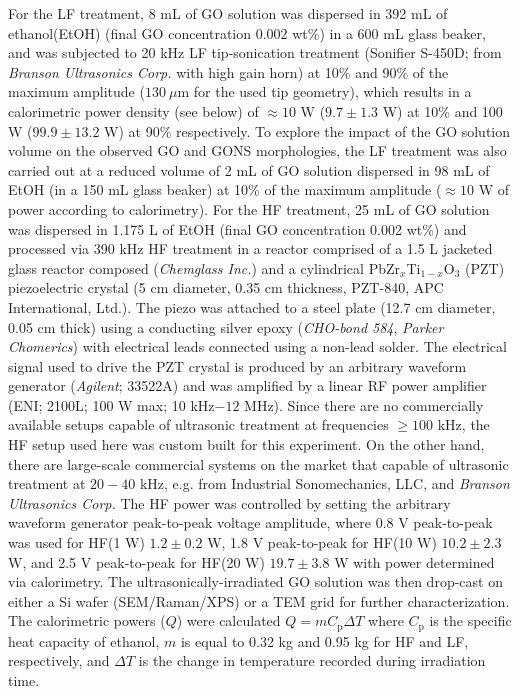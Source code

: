 For the LF treatment, 8 mL of GO solution was dispersed in 392 mL of ethanol(EtOH) (final GO concentration 0.002 wt\%) in a 600 mL glass beaker, and was subjected to 20 kHz LF tip-sonication treatment (Sonifier S-450D; from \textit{Branson Ultrasonics Corp.} with high gain horn) at 10\% and 90\% of the maximum amplitude ($130\ \mu$m for the used tip geometry), which results in a calorimetric power density (see below) of $\approx10$ W ($9.7 \pm 1.3$ W) at 10\% and 100 W ($99.9 \pm 13.2$ W) at 90\% respectively. To explore the impact of the GO solution volume on the observed GO and GONS morphologies, the LF treatment was also carried out at a reduced volume of 2 mL of GO solution dispersed in 98 mL of EtOH (in a 150 mL glass beaker) at 10\% of the maximum amplitude ($\approx10$ W of power according to calorimetry). For the HF treatment, 25 mL of GO solution was dispersed in 1.175 L of EtOH (final GO concentration 0.002 wt\%) and processed via 390 kHz HF treatment in a reactor comprised of a 1.5 L jacketed glass reactor composed (\textit{Chemglass Inc.}) and a cylindrical PbZr$_{x}$Ti$_{1-x}$O$_{3}$ (PZT) piezoelectric crystal (5 cm diameter, 0.35 cm thickness, PZT-840, APC International, Ltd.). The piezo was attached to a steel plate (12.7 cm diameter, 0.05 cm thick) using a conducting silver epoxy (\textit{CHO-bond 584}, \textit{Parker Chomerics}) with electrical leads connected using a non-lead solder. The electrical signal used to drive the PZT crystal is produced by an arbitrary waveform generator (\textit{Agilent}; 33522A) and was amplified by a linear RF power amplifier (ENI; 2100L; 100 W max; 10 kHz$-12$ MHz). Since there are no commercially available setups capable of ultrasonic treatment at frequencies $\geq 100$ kHz, the HF setup used here was custom built for this experiment. On the other hand, there are large-scale commercial systems on the market that capable of ultrasonic treatment at $20-40$ kHz, e.g. from Industrial Sonomechanics, LLC, and \textit{Branson Ultrasonics Corp.}
The HF power was controlled by setting the arbitrary waveform generator peak-to-peak voltage amplitude, where 0.8 V peak-to-peak was used for HF(1 W) $1.2 \pm 0.2$ W, 1.8 V peak-to-peak for HF(10 W) $10.2 \pm 2.3$ W, and 2.5 V peak-to-peak for HF(20 W) $19.7 \pm 3.8$ W with power determined via calorimetry. The ultrasonically-irradiated GO solution was then drop-cast on either a Si wafer (SEM/Raman/XPS) or a TEM grid for further characterization.
The calorimetric powers ($Q$) were calculated $Q = mC_{\mathrm{p}}\Delta T$ where $C_{\mathrm{p}}$ is the specific heat capacity of ethanol, $m$ is equal to 0.32 kg and 0.95 kg for HF and LF, respectively, and $\Delta T$ is the change in temperature recorded during irradiation time.

